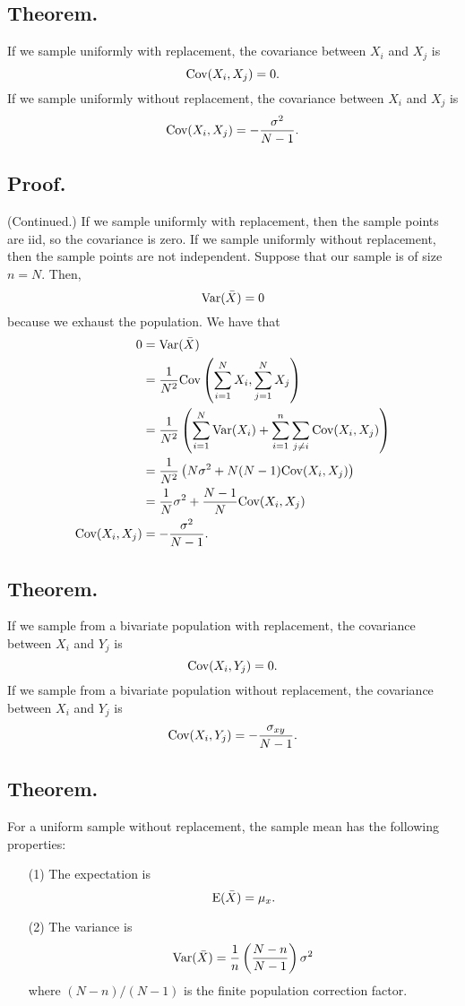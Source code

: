 \documentclass[titlepage]{article}
\begin{document}
\subsection{Theorem.} If we sample uniformly with replacement, the covariance between $X_{i}$ and $X_{j}$ is 
$$\text{Cov}(X_{i}, X_{j}) = 0.$$
If we sample uniformly without replacement, the covariance between $X_{i}$ and $X_{j}$ is
$$\text{Cov}(X_{i}, X_{j}) = -\frac{\sigma^{2}}{N-1}.$$

\subsection{Proof.} (Continued.) If we sample uniformly with replacement, then the sample points are iid, so the covariance is zero. If we sample uniformly without replacement, then the sample points are not independent. Suppose that our sample is of size $n = N$. Then, 
$$\text{Var}(\bar{X}) = 0$$
because we exhaust the population. We have that 
\begin{align*}
                 0 &= \text{Var}(\bar{X}) \\
                   &= \frac{1}{N^{2}}\text{Cov}\left(\sum_{i=1}^{N}X_{i}, \sum_{j=1}^{N}X_{j}\right) \\
                   &= \frac{1}{N^{2}}\left(\sum_{i=1}^{N}\text{Var}(X_{i}) + \sum_{i=1}^{n}\sum_{j \neq i}\text{Cov}(X_{i}, X_{j})\right) \\
                   &= \frac{1}{N^{2}}\left(N\sigma^{2} + N(N-1)\text{Cov}(X_{i}, X_{j})\right) \\
                   &= \frac{1}{N}\sigma^{2} + \frac{N-1}{N}\text{Cov}(X_{i}, X_{j}) \\
\text{Cov}(X_{i}, X_{j}) &= -\frac{\sigma^{2}}{N-1}.
\end{align*}

\subsection{Theorem.} If we sample from a bivariate population with replacement, the covariance between $X_{i}$ and $Y_{j}$ is
$$\text{Cov}(X_{i}, Y_{j}) = 0.$$
If we sample from a bivariate population without replacement, the covariance between $X_{i}$ and $Y_{j}$ is
$$\text{Cov}(X_{i}, Y_{j}) = -\frac{\sigma_{xy}}{N-1}.$$

\subsection{Theorem.} For a uniform sample without replacement, the sample mean has the following properties:
\begin{enumerate}
\item[(1)] The expectation is 
$$\text{E}(\bar{X}) = \mu_{x}.$$
\item[(2)] The variance is 
$$\text{Var}(\bar{X}) = \frac{1}{n}\left(\frac{N-n}{N-1}\right)\sigma^{2}$$
where $(N-n)/(N-1)$ is the finite population correction factor.
\end{enumerate}
\end{document}
